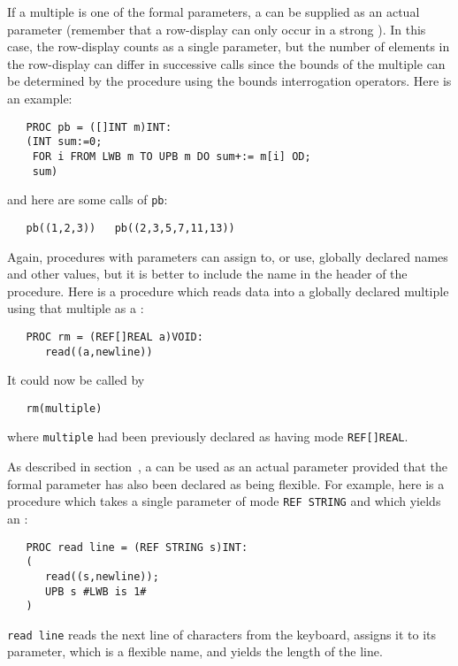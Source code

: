 If a multiple is one of the formal parameters, a
 can be supplied as an actual parameter
(remember that a row-display can only occur in a strong
).  In this case, the row-display counts
as a single parameter, but the number of elements in the row-display
can differ in successive calls since the bounds of the multiple can
be determined by the procedure using the bounds interrogation
operators.  Here is an example:
\begin{verbatim}
   PROC pb = ([]INT m)INT:
   (INT sum:=0;
    FOR i FROM LWB m TO UPB m DO sum+:= m[i] OD;
    sum)
\end{verbatim}
\noindent
and here are some calls of \verb|pb|:
\begin{verbatim}
   pb((1,2,3))   pb((2,3,5,7,11,13))
\end{verbatim}

Again, procedures with parameters can assign to, or use, globally
declared names and other values, but it is better to include the name
in the header of the procedure. Here is a procedure which reads data
into a globally declared multiple using that multiple as a
:
\begin{verbatim}
   PROC rm = (REF[]REAL a)VOID:
      read((a,newline))
\end{verbatim}
\noindent
It could now be called by
\begin{verbatim}
   rm(multiple)
\end{verbatim}
\noindent
where \verb|multiple| had been previously declared as having mode
\verb|REF[]REAL|.

As described in section~, a  can
be used as an actual parameter provided that the formal parameter has
also been declared as being flexible.  For example, here is a
procedure which takes a single parameter of mode \verb|REF STRING|
and which yields an :
\begin{verbatim}
   PROC read line = (REF STRING s)INT:
   (
      read((s,newline));
      UPB s #LWB is 1#
   )
\end{verbatim}
\noindent
\verb|read line| reads the next line of characters from the keyboard,
assigns it to its parameter, which is a flexible name, and yields the
length of the line.

